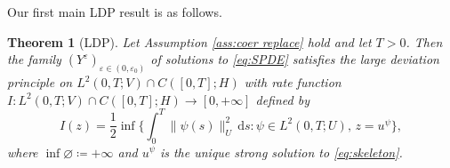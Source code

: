 \documentclass{amsart}
\newcommand{\dd}{\,\mathrm{d}}
\newcommand{\<}{\langle}
\newcommand{\?}{\rangle}
\theoremstyle{plain}
\newtheorem{theorem}{Theorem}[section]
\theoremstyle{remark}
\theoremstyle{plain}
\numberwithin{equation}{section}
\newcommand{\eps}{\varepsilon}
\begin{document}
Our first main LDP result is as follows. 

\begin{theorem}[LDP]\label{th:LDP general}
    Let Assumption \ref{ass:coer replace} hold and let $T>0$. Then the family $(Y^\eps)_{\eps\in(0,\eps_0)}$ of solutions to \eqref{eq:SPDE} satisfies the large deviation principle on $L^2(0,T;V)\cap C([0,T];H)$ with rate function  $I\colon L^2(0,T;V)\cap C([0,T];H)\to [0,+\infty]$ defined by
\begin{equation*} 
I(z)=\frac{1}{2}\inf\Big\{\textstyle{\int_0^T}\|\psi(s)\|_U^2\dd s : \psi\in L^2(0,T;U), \, z=u^{\psi}\Big\},
\end{equation*}
where $\inf\varnothing\coloneqq +\infty$ and $u^\psi$ is the unique strong solution to \eqref{eq:skeleton}. 
\end{theorem} 
\end{document}
